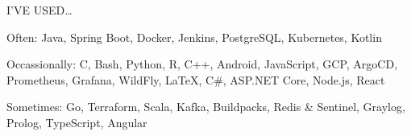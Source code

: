 \begin{minipage}[t]{\linewidth}\vspace{\sectionTopmargin}
{\alignRight\titleFont\light I'VE USED\ldots}\linebreak\newline

\vspace{\contentTopMargin}
{\contentFont\bold Often: \medium Java, Spring Boot, Docker, Jenkins, PostgreSQL, Kubernetes, Kotlin} %

\vspace{1.5mm}
{\contentFont\bold Occassionally: \medium C, Bash, Python, R, C++, Android, JavaScript, GCP,  ArgoCD, Prometheus, Grafana, WildFly, \LaTeX, C\#, ASP.NET Core, Node.js, React}

\vspace{1.5mm}
{\contentFont\bold Sometimes: \medium Go, Terraform, Scala, Kafka, Buildpacks, Redis \& Sentinel, Graylog, Prolog, TypeScript, Angular}
\end{minipage}\newline%